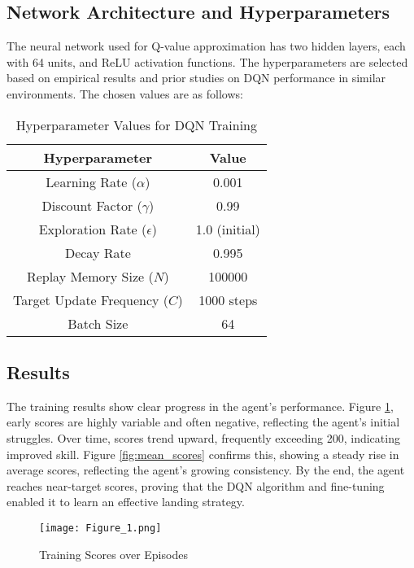 \documentclass[conference]{IEEEtran}
\begin{document}
\subsection{Network Architecture and Hyperparameters}
The neural network used for Q-value approximation has two hidden layers, each with 64 units, and ReLU activation functions. The hyperparameters are selected based on empirical results and prior studies on DQN performance in similar environments. The chosen values are as follows:
	\begin{table}[h]
		\centering
		\caption{Hyperparameter Values for DQN Training}
		\begin{tabular}{|c|c|}
			\hline
			\textbf{Hyperparameter} & \textbf{Value} \\
			\hline
			Learning Rate ($\alpha$) & 0.001 \\
			\hline
			Discount Factor ($\gamma$) & 0.99 \\
			\hline
			Exploration Rate ($\epsilon$) & 1.0 (initial) \\
			\hline
			Decay Rate & 0.995 \\
			\hline
			Replay Memory Size ($N$) & 100000 \\
			\hline
			Target Update Frequency ($C$) & 1000 steps \\
			\hline
			Batch Size & 64 \\
			\hline
		\end{tabular}
		\label{tab:hyperparams}
	\end{table}

\subsection{Results}
The training results show clear progress in the agent’s performance. Figure \ref{fig:training_scores}, early scores are highly variable and often negative, reflecting the agent's initial struggles. Over time, scores trend upward, frequently exceeding 200, indicating improved skill. Figure \ref{fig:mean_scores} confirms this, showing a steady rise in average scores, reflecting the agent's growing consistency. By the end, the agent reaches near-target scores, proving that the DQN algorithm and fine-tuning enabled it to learn an effective landing strategy. 

\begin{figure}[h]
    \centering
    \texttt{[image: Figure\_1.png]}
    \centering
    \caption{Training Scores over Episodes}
    \label{fig:training_scores}
\end{figure}
\end{document}
